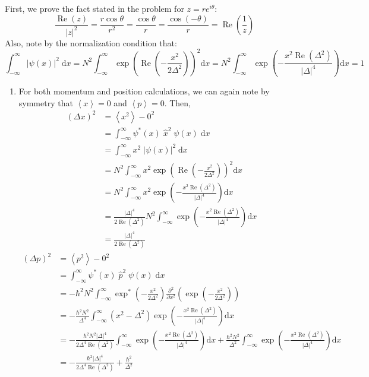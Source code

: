 \begin{sol}
First, we prove the fact stated in the problem for $z = re^{i\theta}$: $$\frac{\operatorname{Re}(z)}{|z|^2} = \frac{r\cos\theta}{r^2} = \frac{\cos\theta}{r} = \frac{\cos{\left(-\theta\right)}}{r} = \operatorname{Re}\left(\frac{1}{z}\right)$$ Also, note by the normalization condition that: $$\int_{-\infty}^{\infty}|\psi(x)|^2\;\mathrm{d}x = N^2\int_{-\infty}^{\infty}\operatorname{exp}\left(\operatorname{Re}\left(-\frac{x^2}{2\Delta^2}\right)\right)^2\mathrm{d}x = N^2\int_{-\infty}^{\infty}\operatorname{exp}\left(-\frac{x^2\operatorname{Re}\left(\Delta^2\right)}{|\Delta|^4}\right)\mathrm{d}x =1$$
\begin{enumerate}[label=\textbf{(\alph*)}]
\item For both momentum and position calculations, we can again note by symmetry that $\left<x\right>=0$ and $\left<p\right>=0$. Then,
\begin{align*}
\left(\Delta x\right)^2 &= \left<x^2\right> - 0^2\\ &= \int_{-\infty}^{\infty}\psi^*(x)\;\hat{x}^2\;\psi(x)\;\mathrm{d}x \\ &= \int_{-\infty}^{\infty}x^2\;|\psi(x)|^2\;\mathrm{d}x \\ &= N^2\int_{-\infty}^{\infty}x^2\operatorname{exp}\left(\operatorname{Re}\left(-\frac{x^2}{2\Delta^2}\right)\right)^2\mathrm{d}x \\ &= N^2\int_{-\infty}^{\infty}x^2\operatorname{exp}\left(-\frac{x^2\operatorname{Re}\left(\Delta^2\right)}{|\Delta|^4}\right)\mathrm{d}x \\ &= \frac{|\Delta|^4}{2\operatorname{Re}\left(\Delta^2\right)}N^2\int_{-\infty}^{\infty}\operatorname{exp}\left(-\frac{x^2\operatorname{Re}\left(\Delta^2\right)}{|\Delta|^4}\right)\mathrm{d}x \\ &= \frac{|\Delta|^4}{2\operatorname{Re}\left(\Delta^2\right)}
\end{align*}
\begin{align*}
\left(\Delta p\right)^2 &= \left<p^2\right> - 0^2  \\ &= \int_{-\infty}^{\infty}\psi^*(x)\;\hat{p}^2\;\psi(x)\;\mathrm{d}x \\ &= -\hbar^2N^2\int_{-\infty}^{\infty}\operatorname{exp}^*\left(-\frac{x^2}{2\Delta^2}\right)\frac{\partial^2}{\partial x^2}\left(\operatorname{exp}\left(-\frac{x^2}{2\Delta^2}\right)\right) \\ &= -\frac{\hbar^2N^2}{\Delta^4}\int_{-\infty}^{\infty}\left(x^2 -\Delta^2\right)\operatorname{exp}\left(-\frac{x^2\operatorname{Re}\left(\Delta^2\right)}{|\Delta|^4}\right)\mathrm{d}x \\ &= -\frac{\hbar^2N^2|\Delta|^4}{2\Delta^4\operatorname{Re}\left(\Delta^2\right)}\int_{-\infty}^{\infty}\operatorname{exp}\left(-\frac{x^2\operatorname{Re}\left(\Delta^2\right)}{|\Delta|^4}\right)\mathrm{d}x + \frac{\hbar^2N^2}{\Delta^2}\int_{-\infty}^{\infty}\operatorname{exp}\left(-\frac{x^2\operatorname{Re}\left(\Delta^2\right)}{|\Delta|^4}\right)\mathrm{d}x \\ &= -\frac{\hbar^2|\Delta|^4}{2\Delta^4\operatorname{Re}\left(\Delta^2\right)}+ \frac{\hbar^2}{\Delta^2}

\end{align*}
\end{enumerate}
\end{sol}
